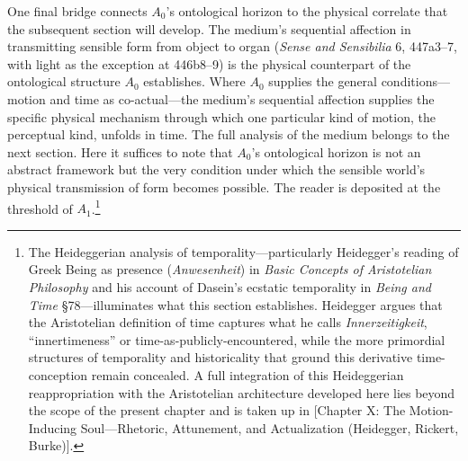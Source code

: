 One final bridge connects $A_0$'s ontological horizon to the physical correlate that the subsequent section will develop. The medium's sequential affection in transmitting sensible form from object to organ (\textit{Sense and Sensibilia} 6, 447a3--7, with light as the exception at 446b8--9) is the physical counterpart of the ontological structure $A_0$ establishes. Where $A_0$ supplies the general conditions---motion and time as co-actual---the medium's sequential affection supplies the specific physical mechanism through which one particular kind of motion, the perceptual kind, unfolds in time. The full analysis of the medium belongs to the next section. Here it suffices to note that $A_0$'s ontological horizon is not an abstract framework but the very condition under which the sensible world's physical transmission of form becomes possible. The reader is deposited at the threshold of $A_1$.\footnote{The Heideggerian analysis of temporality---particularly Heidegger's reading of Greek Being as presence (\textit{Anwesenheit}) in \textit{Basic Concepts of Aristotelian Philosophy} and his account of Dasein's ecstatic temporality in \textit{Being and Time} \S78---illuminates what this section establishes. Heidegger argues that the Aristotelian definition of time captures what he calls \textit{Innerzeitigkeit}, ``innertimeness'' or time-as-publicly-encountered, while the more primordial structures of temporality and historicality that ground this derivative time-conception remain concealed. A full integration of this Heideggerian reappropriation with the Aristotelian architecture developed here lies beyond the scope of the present chapter and is taken up in [Chapter X: The Motion-Inducing Soul---Rhetoric, Attunement, and Actualization (Heidegger, Rickert, Burke)].}
